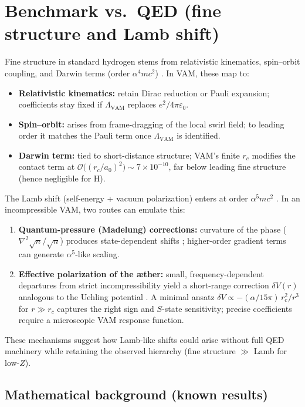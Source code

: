 \documentclass[12pt]{article}
\newcommand{\rc}{r_c}
\newcommand{\Lam}{\Lambda_{\text{VAM}}}
\begin{document}
    \section{Benchmark vs.\ QED (fine structure and Lamb shift)}
    Fine structure in standard hydrogen stems from relativistic kinematics, spin--orbit coupling, and Darwin terms (order \(\alpha^4 m c^2\)) \cite{BetheSalpeter1957}. In VAM, these map to:
    \begin{itemize}
        \item \textbf{Relativistic kinematics:} retain Dirac reduction or Pauli expansion; coefficients stay fixed if \(\Lam\) replaces \(e^2/4\pi\varepsilon_0\).
        \item \textbf{Spin--orbit:} arises from frame-dragging of the local swirl field; to leading order it matches the Pauli term once \(\Lam\) is identified.
        \item \textbf{Darwin term:} tied to short-distance structure; VAM’s finite \(\rc\) modifies the contact term at \(\mathcal{O}\!\big((\rc/a_0)^2\big)\sim 7\times 10^{-10}\), far below leading fine structure (hence negligible for H).
    \end{itemize}
    The Lamb shift (self-energy + vacuum polarization) enters at order \(\alpha^5 m c^2\) \cite{Bethe1947,Eides2001}. In an incompressible VAM, two routes can emulate this:
    \begin{enumerate}
        \item \textbf{Quantum-pressure (Madelung) corrections:} curvature of the phase (\(\nabla^2\sqrt{n}/\sqrt{n}\)) produces state-dependent shifts \cite{Madelung1927,Hiley2012}; higher-order gradient terms can generate \(\alpha^5\)-like scaling.
        \item \textbf{Effective polarization of the æther:} small, frequency-dependent departures from strict incompressibility yield a short-range correction \(\delta V(r)\) analogous to the Uehling potential \cite{Uehling1935}. A minimal ansatz \(\delta V \propto -(\alpha/15\pi)\,\rc^2/r^3\) for \(r\gg \rc\) captures the right sign and \(S\)-state sensitivity; precise coefficients require a microscopic VAM response function.
    \end{enumerate}
    These mechanisms suggest how Lamb-like shifts could arise without full QED machinery while retaining the observed hierarchy (fine structure \(\gg\) Lamb for low-\(Z\)).

    \subsection*{Mathematical background (known results)}
\end{document}
